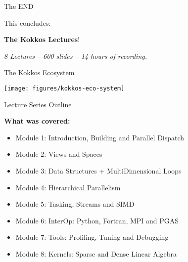 \begin{frame}
{\Huge The END}

\vspace{10pt}
\begin{center}
	{\Large This concludes:}

	\vspace{20pt}
	{\Huge \textbf{The Kokkos Lectures}!}

	\vspace{20pt}
	\textit{8 Lectures -- 600 slides -- 14 hours of recording.}
\end{center}
\end{frame}

\begin{frame}[fragile]{The Kokkos Ecosystem}
  \begin{center}
    \texttt{[image: figures/kokkos-eco-system]}
  \end{center}
\end{frame}

\begin{frame}[fragile]{Lecture Series Outline}

\textbf{What was covered:}

\begin{itemize}
        \item Module 1: Introduction, Building and Parallel Dispatch
        \item Module 2: Views and Spaces
        \item Module 3: Data Structures + MultiDimensional Loops
        \item Module 4: Hierarchical Parallelism
        \item Module 5: Tasking, Streams and SIMD
        \item Module 6: InterOp: Python, Fortran, MPI and PGAS
        \item Module 7: Tools: Profiling, Tuning and Debugging
        \item Module 8: Kernels: Sparse and Dense Linear Algebra
\end{itemize}

\end{frame}


